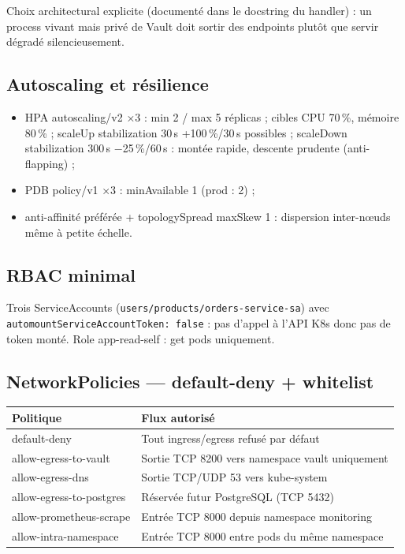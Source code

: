 \documentclass[12pt,a4paper,twoside,openright]{report}
\begin{document}
Choix architectural explicite (documenté dans le docstring du handler) : un process vivant mais privé de Vault doit sortir des endpoints plutôt que servir dégradé silencieusement.

\subsection{Autoscaling et résilience}
\begin{itemize}[itemsep=1pt]
  \item HPA autoscaling/v2 ×3 : min 2 / max 5 réplicas ; cibles CPU 70\,\%, mémoire 80\,\% ; scaleUp stabilization 30\,s +100\,\%/30\,s possibles ; scaleDown stabilization 300\,s $-$25\,\%/60\,s : montée rapide, descente prudente (anti-flapping) ;
  \item PDB policy/v1 ×3 : minAvailable 1 (prod : 2) ;
  \item anti-affinité préférée + topologySpread maxSkew 1 : dispersion inter-nœuds même à petite échelle.
\end{itemize}

\subsection{RBAC minimal}
Trois ServiceAccounts (\texttt{users/products/orders-service-sa}) avec \texttt{automountServiceAccountToken: false} : pas d'appel à l'API K8s donc pas de token monté. Role app-read-self : get pods uniquement.

\subsection{NetworkPolicies --- default-deny + whitelist}
\begin{center}\label{tab:ch-manifests-applicatifs-networkpolicies-default-de}\end{center}
\begin{longtable}{@{}p{4.6cm}p{9.6cm}@{}}
\toprule
\textbf{Politique} & \textbf{Flux autorisé} \\
\midrule
\endhead
default-deny & Tout ingress/egress refusé par défaut \\
allow-egress-to-vault & Sortie TCP 8200 vers namespace vault uniquement \\
allow-egress-dns & Sortie TCP/UDP 53 vers kube-system \\
allow-egress-to-postgres & Réservée futur PostgreSQL (TCP 5432) \\
allow-prometheus-scrape & Entrée TCP 8000 depuis namespace monitoring \\
allow-intra-namespace & Entrée TCP 8000 entre pods du même namespace \\
\bottomrule
\end{longtable}
\end{document}
